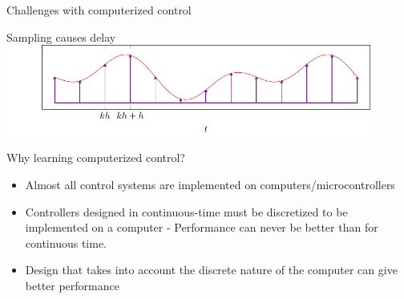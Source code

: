 \documentclass[presentation,aspectratio=169]{beamer}
\begin{document}
\begin{frame}[label={sec:org2653894}]{Challenges with computerized control}
\begin{block}{Sampling causes delay}
\includegraphics[width=0.9\textwidth]{../../figures/modulation-model-timeseries}
\end{block}
\end{frame}


\begin{frame}[label={sec:org7721946}]{Why learning computerized control?}
\begin{itemize}
\item Almost all control systems are implemented on computers/microcontrollers
\item Controllers designed in continuous-time must be discretized to be implemented on a computer - Performance can never be better than for continuous time.
\item Design that takes into account the discrete nature of the computer can give better performance
\end{itemize}
\end{frame}
\end{document}
